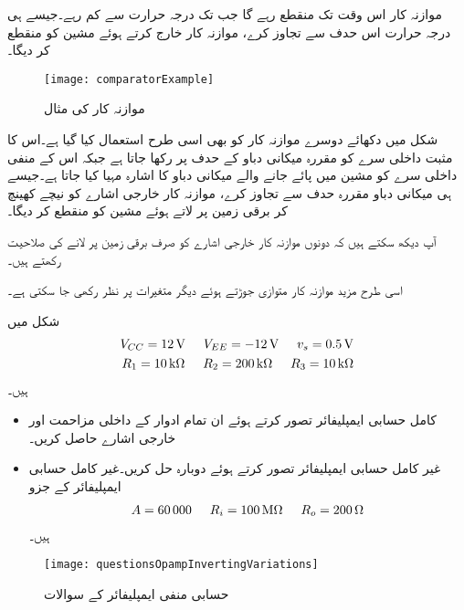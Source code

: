 موازنہ کار اس وقت تک منقطع رہے گا جب تک درجہ حرارت  سے کم رہے۔جیسے ہی درجہ حرارت اس حدف سے تجاوز کرے، موازنہ کار   خارج کرتے ہوئے مشین کو منقطع کر دیگا۔
\begin{figure}
\centering
\texttt{[image: comparatorExample]}
\caption{موازنہ کار کی مثال}
\label{شکل_حسابی_موازنہ_کار_مقررہ_حدف}
\end{figure}

شکل میں دکھائے دوسرے موازنہ کار کو بھی اسی طرح استعمال کیا گیا ہے۔اس کا مثبت داخلی سرے کو مقررہ میکانی دباو کے حدف پر رکھا جاتا ہے جبکہ اس کے منفی داخلی سرے  کو مشین میں پائے جانے والے میکانی دباو کا اشارہ مہیا کیا جاتا ہے۔جیسے ہی میکانی دباو مقررہ حدف سے تجاوز  کرے، موازنہ کار خارجی اشارے  کو نیچے کھینچ کر برقی زمین  پر لاتے ہوئے مشین کو منقطع کر دیگا۔

آپ دیکھ سکتے ہیں کہ دونوں موازنہ کار خارجی اشارے کو صرف برقی زمین پر لانے کی صلاحیت رکھتے ہیں۔

اسی طرح مزید موازنہ کار متوازی جوڑتے ہوئے دیگر متغیرات پر نظر رکھی جا سکتی ہے۔
\newpage
{}

شکل  میں
\begin{align*}
V_{CC}=\SI{12}{\volt} \hspace{5mm} V_{EE}=\SI{-12}{\volt} \hspace{5mm} v_s=\SI{0.5}{\volt}\\
R_1=\SI{10}{\kilo \ohm} \hspace {5mm} R_2=\SI{200}{\kilo \ohm} \hspace{5mm} R_3=\SI{10}{\kilo \ohm}
\end{align*}
ہیں۔
\begin{itemize}
\item
کامل حسابی ایمپلیفائر تصور کرتے ہوئے ان تمام ادوار کے داخلی مزاحمت اور خارجی اشارے  حاصل کریں۔
\item
غیر کامل حسابی ایمپلیفائر تصور کرتے ہوئے دوبارہ حل کریں۔غیر کامل حسابی ایمپلیفائر کے جزو
\begin{align*}
A=\num{60000} \hspace{5mm} R_i=\SI{100}{\mega \ohm} \hspace{5mm} R_o=\SI{200}{\ohm}
\end{align*}
ہیں۔
\end{itemize}
%
\begin{figure}
\centering
\texttt{[image: questionsOpampInvertingVariations]}
\caption{حسابی منفی ایمپلیفائر کے سوالات}
\label{شکل_حسابی_منفی_اقسام}
\end{figure}

